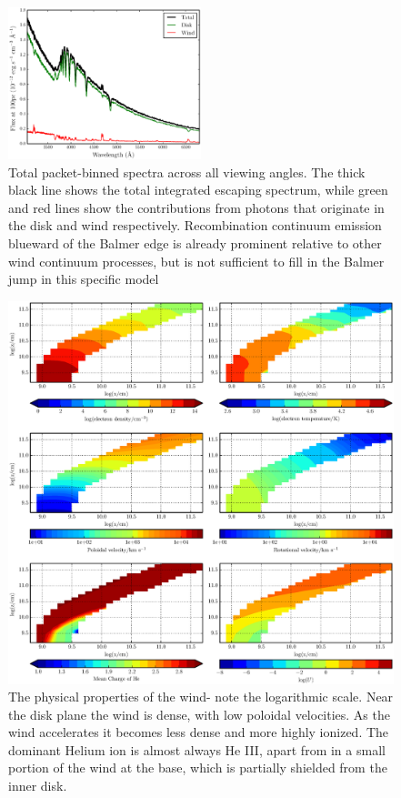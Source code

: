 \documentclass[preprint, a4paper, 11pt]{aastex}
\begin{document}
{\begin{figure} 
\includegraphics[width=0.5\textwidth]{figures/fig7_escaping.eps}
\caption{Total packet-binned spectra across all viewing angles. 
The thick black line shows the total 
integrated escaping spectrum, while green and red lines show the contributions from photons that originate
in the disk and wind respectively. Recombination continuum emission blueward of the Balmer 
edge is already prominent relative to other wind continuum processes, but is not sufficient
to fill in the Balmer jump in this specific model}
\label{cont}
\end{figure} 





\begin{figure} %
\includegraphics[width=\textwidth]{figures/fig5.eps}
\caption{
The physical properties of the wind- note the logarithmic scale. 
Near the disk plane the wind is dense, with low poloidal velocities.
As the wind accelerates it becomes less dense
and more highly ionized. The dominant Helium ion
is almost always He III, apart from in a small
portion of the wind at the base, which is partially shielded
from the inner disk.
}
\label{wind}
\end{figure} %


}
\end{document}
